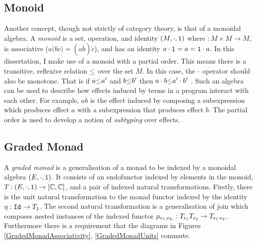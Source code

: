 \documentclass{Report}
\begin{document}
\subsection{Monoid}

Another concept, though not strictly of category theory, is that of a monoidal algebra. A \textit{monoid} is a set, operation, and identity $(M, \dot, \1)$ where $\dot: M\times M \rightarrow M$, is associative ($a\dot(b\dot c) = (a\dot b)\dot c$), and has an identity $a\dot\1 = a = \1\dot a$. In this dissertation, I make use of a monoid with a partial order. This means there is a transitive, reflexive relation $\subeffect$ over the set $M$. In this case, the $\dot$ operator should also be monotone. That is if $a \subeffect a'$ and $b\subeffect b'$ then $a\dot b \subeffect a'\dot b'$ . Such an algebra can be used to describe how effects induced by terms in a program interact with each other. For example, $a \dot b$ is the effect induced by composing a subexpression which produces effect $a$ with a subexpression that produces effect $b$. The partial order is used to develop a notion of \textit{subtyping} over effects.

\subsection{Graded Monad}


A \textit{graded monad} is a generalisation of a monad to be indexed by a monoidal algebra $(E,\dot, \1)$. It consists of an endofunctor indexed by elements in the monoid, $\T{}{}: (E, \dot, \1)  \rightarrow [\C, \C]$, and a pair of indexed natural transformations. Firstly, there is the unit natural transformation to the monad functor indexed by the identity $\point{}: \Id{} \rightarrow \T{\1}{}$. The second natural transformation is a generalisation of join which composes nested instances of the indexed functor $\bind{\e_1}{\e_2}{}: \T{\e_1}{\T{\e_2}{}} \rightarrow \T{\e_1 \dot \e_2}{}$. Furthermore there is a requirement that the diagrams in Figures \ref{GradedMonadAssociativity}, \ref{GradedMonadUnits} commute.
\end{document}
